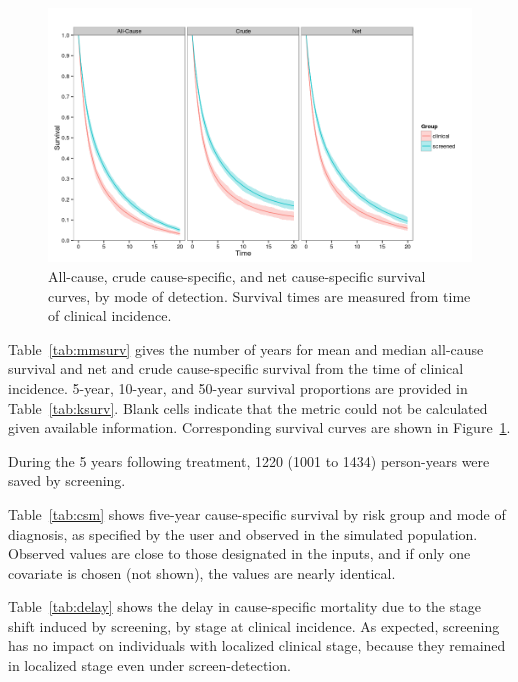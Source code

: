 \documentclass[11pt]{article}
\begin{document}
\begin{figure}[!ht]
    \centering
    \includegraphics[width=\textwidth]{../output/survival_curves.png}
    \caption{All-cause, crude cause-specific, and net cause-specific survival curves, by mode of detection. Survival times are measured from time of clinical incidence.}
    \label{fig:surv}
\end{figure}
	
Table~\ref{tab:mmsurv} gives the number of years for mean and median all-cause survival and net and crude cause-specific survival from the time of clinical incidence. 5-year, 10-year, and 50-year survival proportions are provided in Table~\ref{tab:ksurv}.
Blank cells indicate that the metric could not be calculated given available information.
Corresponding survival curves are shown in Figure~\ref{fig:surv}. 

During the 5 years following treatment, 1220 (1001 to 1434) person-years were saved by screening.

Table~\ref{tab:csm} shows five-year cause-specific survival by risk group and mode of diagnosis, as specified by the user and observed in the simulated population. Observed values are close to those designated in the inputs, and if only one covariate is chosen (not shown), the values are nearly identical.

Table~\ref{tab:delay} shows the delay in cause-specific mortality due to the stage shift induced by screening, by stage at clinical incidence. As expected, screening has no impact on individuals with localized clinical stage, because they remained in localized stage even under screen-detection.
\end{document}
